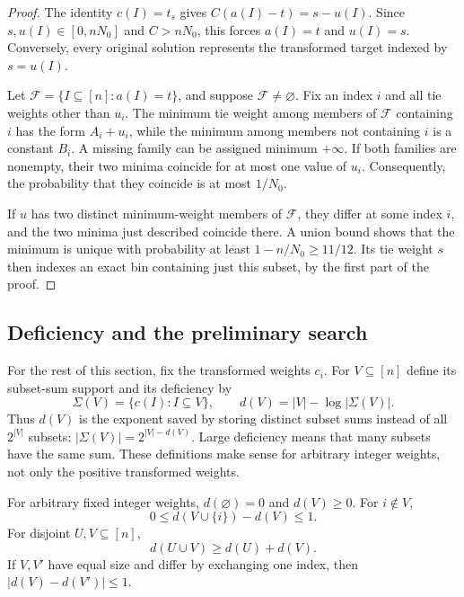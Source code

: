 \begin{proof}
The identity $c(I)=t_s$ gives
$C(a(I)-t)=s-u(I)$.  Since $s,u(I)\in[0,nN_0]$ and $C>nN_0$, this
forces $a(I)=t$ and $u(I)=s$.  Conversely, every original solution
represents the transformed target indexed by $s=u(I)$.

Let $\mathcal F=\{I\subseteq[n]:a(I)=t\}$, and suppose
$\mathcal F\ne\varnothing$.  Fix an index $i$ and all tie weights other
than $u_i$.  The minimum tie weight among members of $\mathcal F$
containing $i$ has the form $A_i+u_i$, while the minimum among members
not containing $i$ is a constant $B_i$.  A missing family can be assigned
minimum $+\infty$.  If both families are nonempty, their two minima
coincide for at most one value of $u_i$.  Consequently, the probability
that they coincide is at most $1/N_0$.

If $u$ has two distinct minimum-weight members of $\mathcal F$, they
differ at some index $i$, and the two minima just described coincide
there.  A union bound shows that the minimum is unique with probability
at least $1-n/N_0\ge11/12$.  Its tie weight $s$ then indexes an exact
bin containing just this subset, by the first part of the proof.
\end{proof}

\subsection{Deficiency and the preliminary search}

For the rest of this section, fix the transformed weights $c_i$.
For $V\subseteq[n]$ define its subset-sum support and its deficiency by
\begin{equation}
\label{eq:deficiency}
 \Sigma(V)=\{c(I):I\subseteq V\},\qquad
 d(V)=|V|-\log|\Sigma(V)|.
\end{equation}
Thus $d(V)$ is the exponent saved by storing distinct subset sums
instead of all $2^{|V|}$ subsets: $|\Sigma(V)|=2^{|V|-d(V)}$.
Large deficiency means that many subsets have the same sum.
These definitions make sense for arbitrary integer weights, not only
the positive transformed weights.

\begin{lemma}
\label{lem:deficiency}
For arbitrary fixed integer weights, $d(\varnothing)=0$ and $d(V)\ge0$.
For $i\notin V$,
\[
 0\le d(V\cup\{i\})-d(V)\le1.
\]
For disjoint $U,V\subseteq[n]$,
\[
 d(U\cup V)\ge d(U)+d(V).
\]
If $V,V'$ have equal size and differ by exchanging one index, then
$|d(V)-d(V')|\le1$.
\end{lemma}


